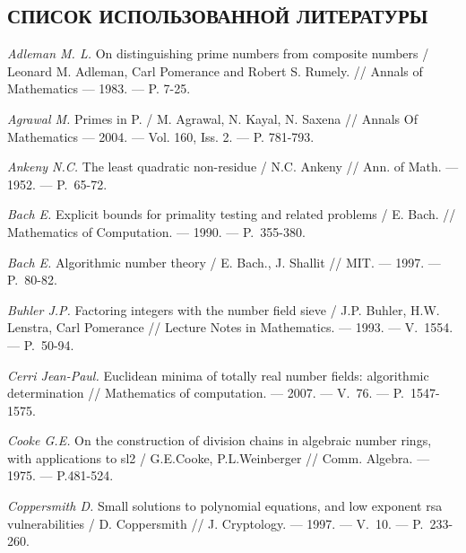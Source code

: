 \begin{center}
    \chapter*{СПИСОК ИСПОЛЬЗОВАННОЙ ЛИТЕРАТУРЫ}
\end{center}

\begin{thebibliography}{99}
\vspace{-12pt}

    \textit{Adleman M. L.} On distinguishing prime numbers from composite numbers / Leonard M. Adleman, Carl Pomerance and Robert S. Rumely. // Annals of Mathematics --- 1983. --- P. 7-25.
    
    \textit{Agrawal M.} Primes in P. / M. Agrawal, N. Kayal, N. Saxena // Annals Of Mathematics --- 2004. --- Vol. 160, Iss. 2. --- P. 781-793.
    
    \textit{Ankeny N.C.} The least quadratic non-residue / N.C. Ankeny // Ann. of Math. --- 1952. --- P.~65-72.

    \textit{Bach E.} Explicit bounds for primality testing and related problems / E. Bach. // Mathematics of Computation. --- 1990. --- P.~355-380.
    
    \textit{Bach E.} Algorithmic number theory / E. Bach., J. Shallit // MIT. --- 1997. --- P.~80-82.
    
    \textit{Buhler J.P.} Factoring integers with the number field sieve / J.P. Buhler, H.W. Lenstra, Carl Pomerance // Lecture Notes in Mathematics. --- 1993. --- V.~1554. --- P.~50-94.

    \textit{Cerri Jean-Paul.} Euclidean minima of totally real number fields: algorithmic determination // Mathematics of computation. --- 2007. --- V.~76. --- {P.}~1547-1575.

    \textit{Cooke G.E.} On the construction of division chains in algebraic number rings, with applications to sl2 / G.E.Cooke, P.L.Weinberger // Comm. Algebra. --- 1975. --- P.481-524.

    \textit{Coppersmith D.} Small solutions to polynomial equations, and low exponent rsa vulnerabilities / D. Coppersmith // J. Cryptology. --- 1997. --- V.~10. --- P.~233-260.


\end{thebibliography}
